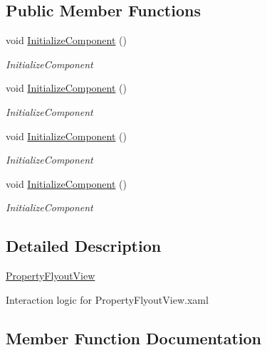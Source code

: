 \subsection*{Public Member Functions}
\begin{DoxyCompactItemize}
\item 
void \hyperlink{class_presentation_1_1_view_1_1_flyout_1_1_property_flyout_view_a9b44c10f88d02a145b30b550ebfbf1ac}{Initialize\+Component} ()
\begin{DoxyCompactList}\small\item\em Initialize\+Component \end{DoxyCompactList}\item 
void \hyperlink{class_presentation_1_1_view_1_1_flyout_1_1_property_flyout_view_a9b44c10f88d02a145b30b550ebfbf1ac}{Initialize\+Component} ()
\begin{DoxyCompactList}\small\item\em Initialize\+Component \end{DoxyCompactList}\item 
void \hyperlink{class_presentation_1_1_view_1_1_flyout_1_1_property_flyout_view_a9b44c10f88d02a145b30b550ebfbf1ac}{Initialize\+Component} ()
\begin{DoxyCompactList}\small\item\em Initialize\+Component \end{DoxyCompactList}\item 
void \hyperlink{class_presentation_1_1_view_1_1_flyout_1_1_property_flyout_view_a9b44c10f88d02a145b30b550ebfbf1ac}{Initialize\+Component} ()
\begin{DoxyCompactList}\small\item\em Initialize\+Component \end{DoxyCompactList}\end{DoxyCompactItemize}


\subsection{Detailed Description}
\hyperlink{class_presentation_1_1_view_1_1_flyout_1_1_property_flyout_view}{Property\+Flyout\+View} 

Interaction logic for Property\+Flyout\+View.\+xaml 

\subsection{Member Function Documentation}
\mbox{\label{class_presentation_1_1_view_1_1_flyout_1_1_property_flyout_view_a9b44c10f88d02a145b30b550ebfbf1ac}} 
